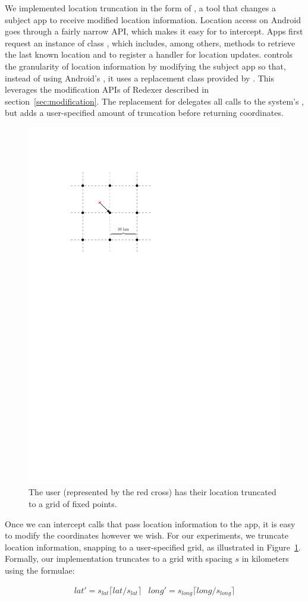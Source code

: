 We implemented location truncation in the form of \fuzzer{}, a tool
that changes a subject app to receive modified location information.
Location access on Android goes through a fairly narrow API, which
makes it easy for \fuzzer{} to intercept. Apps first request an
instance of class , which includes, among
others, methods to retrieve the last known location and to register a
handler for location updates.  \fuzzer{} controls the granularity of
location information by modifying the subject app so that, instead of
using Android's , it uses a replacement class
provided by \fuzzer{}. This leverages the modification APIs of Redexer
described in section~\ref{sec:modification}. The replacement for
 delegates all calls to the system's
, but adds a user-specified amount of truncation
before returning coordinates.

\begin{figure}
  \centering
  \includegraphics[width=.4\columnwidth]{location_privacy/location_grid_truncation_example}
  \caption{The user (represented by the red cross) has their location
    truncated to a grid of fixed points.}
  \label{fig:grid-truncation-example}
\end{figure}

Once we can intercept calls that pass location information to the app,
it is easy to modify the coordinates however we wish. For our
experiments, we truncate location information, snapping to a
user-specified grid, as illustrated in
Figure~\ref{fig:grid-truncation-example}.  Formally, our
implementation truncates to a grid with spacing $s$ in kilometers
using the formulae:

\begin{displaymath}
  \begin{array}{cc}
    \textit{lat}' = s_\textit{lat} \lceil \textit{lat} /s_\textit{lat} \rceil &
    \textit{long}' = s_\textit{long} \lceil \textit{long} /s_\textit{long} \rceil
  \end{array}
\end{displaymath}

